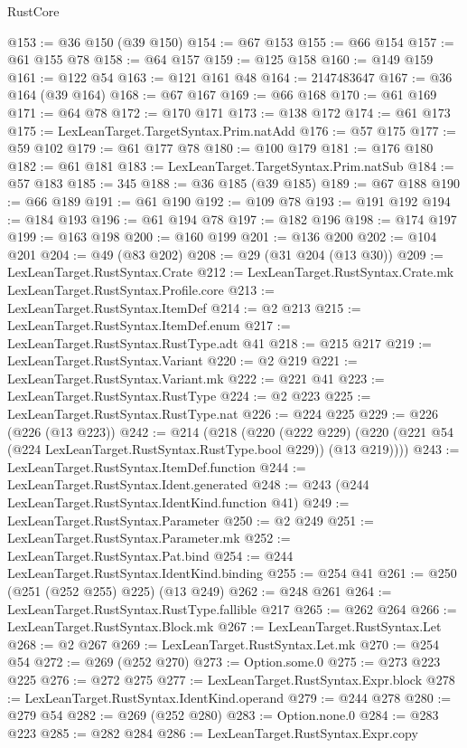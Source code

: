 \begin{lexlean}{RustCore}
\begin{coremodule}
@153 := @36 @150 (@39 @150)
@154 := @67 @153
@155 := @66 @154
@157 := @61 @155 @78
@158 := @64 @157
@159 := @125 @158
@160 := @149 @159
@161 := @122 @54
@163 := @121 @161 @48
@164 := 2147483647
@167 := @36 @164 (@39 @164)
@168 := @67 @167
@169 := @66 @168
@170 := @61 @169
@171 := @64 @78
@172 := @170 @171
@173 := @138 @172
@174 := @61 @173
@175 := LexLeanTarget.TargetSyntax.Prim.natAdd
@176 := @57 @175
@177 := @59 @102
@179 := @61 @177 @78
@180 := @100 @179
@181 := @176 @180
@182 := @61 @181
@183 := LexLeanTarget.TargetSyntax.Prim.natSub
@184 := @57 @183
@185 := 345
@188 := @36 @185 (@39 @185)
@189 := @67 @188
@190 := @66 @189
@191 := @61 @190
@192 := @109 @78
@193 := @191 @192
@194 := @184 @193
@196 := @61 @194 @78
@197 := @182 @196
@198 := @174 @197
@199 := @163 @198
@200 := @160 @199
@201 := @136 @200
@202 := @104 @201
@204 := @49 (@83 @202)
@208 := @29 (@31 @204 (@13 @30))
@209 := LexLeanTarget.RustSyntax.Crate
@212 := LexLeanTarget.RustSyntax.Crate.mk LexLeanTarget.RustSyntax.Profile.core
@213 := LexLeanTarget.RustSyntax.ItemDef
@214 := @2 @213
@215 := LexLeanTarget.RustSyntax.ItemDef.enum
@217 := LexLeanTarget.RustSyntax.RustType.adt @41
@218 := @215 @217
@219 := LexLeanTarget.RustSyntax.Variant
@220 := @2 @219
@221 := LexLeanTarget.RustSyntax.Variant.mk
@222 := @221 @41
@223 := LexLeanTarget.RustSyntax.RustType
@224 := @2 @223
@225 := LexLeanTarget.RustSyntax.RustType.nat
@226 := @224 @225
@229 := @226 (@226 (@13 @223))
@242 := @214
    (@218
      (@220
        (@222 @229)
        (@220 (@221 @54 (@224 LexLeanTarget.RustSyntax.RustType.bool @229)) (@13 @219))))
@243 := LexLeanTarget.RustSyntax.ItemDef.function
@244 := LexLeanTarget.RustSyntax.Ident.generated
@248 := @243 (@244 LexLeanTarget.RustSyntax.IdentKind.function @41)
@249 := LexLeanTarget.RustSyntax.Parameter
@250 := @2 @249
@251 := LexLeanTarget.RustSyntax.Parameter.mk
@252 := LexLeanTarget.RustSyntax.Pat.bind
@254 := @244 LexLeanTarget.RustSyntax.IdentKind.binding
@255 := @254 @41
@261 := @250 (@251 (@252 @255) @225) (@13 @249)
@262 := @248 @261
@264 := LexLeanTarget.RustSyntax.RustType.fallible @217
@265 := @262 @264
@266 := LexLeanTarget.RustSyntax.Block.mk
@267 := LexLeanTarget.RustSyntax.Let
@268 := @2 @267
@269 := LexLeanTarget.RustSyntax.Let.mk
@270 := @254 @54
@272 := @269 (@252 @270)
@273 := Option.some.{0}
@275 := @273 @223 @225
@276 := @272 @275
@277 := LexLeanTarget.RustSyntax.Expr.block
@278 := LexLeanTarget.RustSyntax.IdentKind.operand
@279 := @244 @278
@280 := @279 @54
@282 := @269 (@252 @280)
@283 := Option.none.{0}
@284 := @283 @223
@285 := @282 @284
@286 := LexLeanTarget.RustSyntax.Expr.copy

\end{coremodule}
\end{lexlean}
